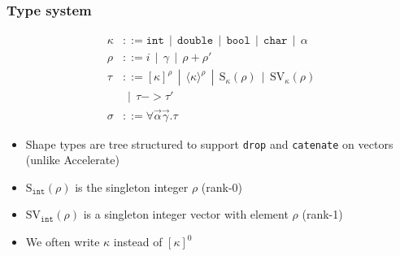 \documentclass{beamer}
\newcommand{\kw}[1]{\texttt{#1}}
\newcommand{\A}[2]{[#1]^{#2}}
\newcommand{\V}[2]{\langle#1\rangle^{#2}}
\renewcommand{\S}[2]{\textrm{S}_{#1}(#2)}
\newcommand{\SV}[2]{\textrm{SV}_{#1}(#2)}
\begin{document}





\begin{frame}[fragile]
\frametitle{Type system}

\begin{align*}
\kappa & ::= \kw{int} ~~|~~ \kw{double} ~~|~~ \kw{bool} ~~|~~ \kw{char} ~~|~~ \alpha \tag{base types} \\
\rho & ::= i ~~|~~ \gamma ~~|~~ \rho + \rho' \tag{shape types} \\
\tau & ::= \A{\kappa}{\rho} ~~|~~ \V{\kappa}{\rho} ~~|~~ \S{\kappa}{\rho} ~~|~~ \SV{\kappa}{\rho} \\
 &  ~~|~~ \tau -> \tau' \tag{types} \\
\sigma & ::= \forall \vec{\alpha} \vec{\gamma}.\tau \tag{type schemes}
\end{align*}

\begin{itemize}
\item Shape types are tree structured to support \texttt{drop} and
  \texttt{catenate} on vectors (unlike Accelerate)
\item $\S{\kw{int}}{\rho}$ is the singleton integer $\rho$ (rank-0)
\item $\SV{\kw{int}}{\rho}$ is a singleton integer vector with element $\rho$  (rank-1)
\item We often write $\kappa$ instead of $[\kappa]^0$
\end{itemize}
\end{frame}
\end{document}
